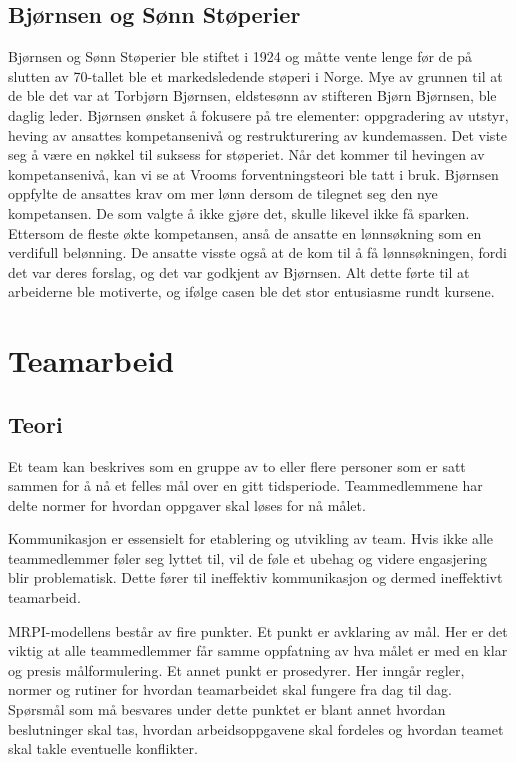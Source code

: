 \documentclass[norsk]{article}
\begin{document}
\subsection{Bjørnsen og Sønn Støperier}
Bjørnsen og Sønn Støperier ble stiftet i 1924 og måtte vente lenge før de på slutten av 70-tallet ble et markedsledende støperi i Norge. Mye av grunnen til at de ble det var at Torbjørn Bjørnsen, eldstesønn av stifteren Bjørn Bjørnsen, ble daglig leder. Bjørnsen ønsket å fokusere på tre elementer: oppgradering av utstyr, heving av ansattes kompetansenivå og restrukturering av kundemassen. Det viste seg å være en nøkkel til suksess for støperiet. Når det kommer til hevingen av kompetansenivå, kan vi se at Vrooms forventningsteori ble tatt i bruk. Bjørnsen oppfylte de ansattes krav om mer lønn dersom de tilegnet seg den nye kompetansen. De som valgte å ikke gjøre det, skulle likevel ikke få sparken. Ettersom de fleste økte kompetansen, anså de ansatte en lønnsøkning som en verdifull belønning. De ansatte visste også at de kom til å få lønnsøkningen, fordi det var deres forslag, og det var godkjent av Bjørnsen. Alt dette førte til at arbeiderne ble motiverte, og ifølge casen ble det stor entusiasme rundt kursene. 

\newpage
\section{Teamarbeid}

\subsection{Teori}
Et team kan beskrives som en gruppe av to eller flere personer som er satt sammen for å nå et felles mål over en gitt tidsperiode. Teammedlemmene har delte normer for hvordan oppgaver skal løses for nå målet.

Kommunikasjon er essensielt for etablering og utvikling av team. Hvis ikke alle teammedlemmer føler seg lyttet til, vil de føle et ubehag og videre engasjering blir problematisk. Dette fører til ineffektiv kommunikasjon og dermed ineffektivt teamarbeid.

MRPI-modellens består av fire punkter. Et punkt er avklaring av mål. Her er det viktig at alle teammedlemmer får samme oppfatning av hva målet er med en klar og presis målformulering. Et annet punkt er prosedyrer. Her inngår regler, normer og rutiner for hvordan teamarbeidet skal fungere fra dag til dag. Spørsmål som må besvares under dette punktet er blant annet hvordan beslutninger skal tas, hvordan arbeidsoppgavene skal fordeles og hvordan teamet skal takle eventuelle konflikter.
\end{document}
